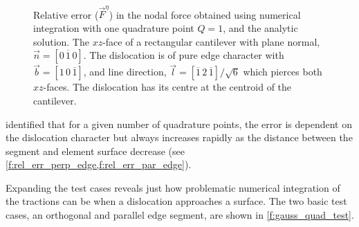 \documentclass[11pt]{iopart}
\begin{document}
\begin{figure}
    \centering
    ~
    \caption{Relative error ($\vec{F}^{\eta}$) in the nodal force obtained using numerical integration with one quadrature point $Q = 1$, and the analytic solution. The $xz$-face of a rectangular cantilever with plane normal, $\vec{n} = \left[0\,\overline{1}\,0\right]$. The dislocation is of pure edge character with $\vec{b} = [1\,0\,\overline{1}]$, and line direction, $\vec{l} = \left[\overline{1}\,2\,\overline{1}\right]/\sqrt{6}$ which pierces both $xz$-faces. The dislocation has its centre at the centroid of the cantilever.}
    \label{f:err_basic_cantilever}
\end{figure}

\citet{Queyreau} identified that for a given number of quadrature points, the error is dependent on the dislocation character but always increases rapidly as the distance between the segment and element surface decrease (see \cref{f:rel_err_perp_edge,f:rel_err_par_edge}).

Expanding the test cases reveals just how problematic numerical integration of the tractions can be when a dislocation approaches a surface. The two basic test cases, an orthogonal and parallel edge segment, are shown in \cref{f:gauss_quad_test}.
\end{document}
